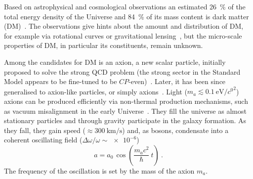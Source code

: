 








Based on astrophysical and cosmological observations an estimated \SI{26}{\percent} of the total energy density of the Universe and \SI{84}{\percent} of its mass content is dark matter (DM)~\cite{Planck2015}. The observations give hints about the amount and distribution of DM, for example via rotational curves or gravitational lensing~\cite{ApJ1990}, but the micro-scale properties of DM, in particular its constituents, remain unknown.

Among the candidates for DM is an axion, a new scalar particle, initially proposed to solve the strong QCD problem (the strong sector in the Standard Model appears to be fine-tuned to be $CP$-even)~\cite{PhysRevLett.38.1440,PQ1977B,Weinberg1978,Wilczek1978,Kim1979,Zakharov1980,Zhitnitsky1980B,Srednicki1981}. Later, it has been since generalised to axion-like particles, or simply axions~\cite{Witten1984,Conlon2006,Witten2006,Arvanitaki2010,Arias2012,Marsh2015Review}. Light ($m_a \lesssim \SI[per-mode=symbol]{0.1}{\electronvolt\per\clight\squared}$) axions can be produced efficiently via non-thermal production mechanisms, such as vacuum misalignment in the early Universe~\cite{Preskill1983cosmo,Sikivie1983cosmo,Dine1983cosmo}. They fill the universe as almost stationary particles and through gravity participate in the galaxy formation. As they fall, they gain speed ($\approx \SI[per-mode=symbol]{300}{\kilo\metre\per\second}$) and, as bosons, condensate into a coherent oscillating field ($\Delta\omega / \omega \sim \num{e-6}$)~\cite{Marsh2015Review}
\begin{equation}
  a = a_0 \, \cos\left(\frac{ m_a c^2 }{\hbar} \ t\right) \ .
\end{equation}
The frequency of the oscillation is set by the mass of the axion $m_a$.

